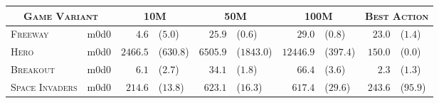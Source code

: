 \begin{tabular}{ll  rl rl  rl rl}
    \multicolumn{2}{c}{\textsc{Game Variant}}
    & \multicolumn{2}{c}{\textsc{10M}}
    & \multicolumn{2}{c}{\textsc{50M}}
    & \multicolumn{2}{c}{\textsc{100M}}
    & \multicolumn{2}{c}{\textsc{Best Action}} \\ \midrule[0.4mm]

\multirow{1}{*}{\textsc{Freeway}}

& m0d0
& $4.6$ & ($5.0$)
& $25.9$ & ($0.6$)
& $29.0$ & ($0.8$)
& $23.0$ & ($1.4$) \\ \cmidrule[0.2mm]{1-10}
                                                      

\multirow{1}{*}{\textsc{Hero}}

& m0d0
& $2466.5$ & ($630.8$)
& $6505.9$ & ($1843.0$)
& $12446.9$ & ($397.4$)
& $150.0$ & ($0.0$)  \\ \cmidrule[0.2mm]{1-10}

\multirow{1}{*}{\textsc{Breakout}}

& m0d0
& $6.1$ & ($2.7$)
& $34.1$ & ($1.8$)
& $66.4$ & ($3.6$)
& $2.3$ & ($1.3$) \\ \cmidrule[0.2mm]{1-10}


\multirow{1}{*}{\textsc{Space Invaders}}

& m0d0
& $214.6$ & ($13.8$)
& $623.1$ & ($16.3$)
& $617.4$ & ($29.6$)
& $243.6$ & ($95.9$)

\end{tabular}
